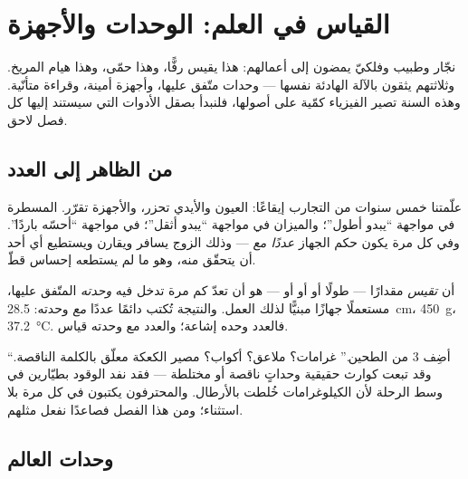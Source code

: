 \chapter{القياس في العلم: الوحدات والأجهزة}\label{ch:g6:measurement-in-science}

نجّار وطبيب وفلكيّ يمضون إلى أعمالهم: هذا يقيس رفًّا، وهذا حمّى،
وهذا هيام المريخ. وثلاثتهم يثقون بالآلة الهادئة نفسها --- وحدات
متّفق عليها، وأجهزة أمينة، وقراءة متأنّية. وهذه السنة تصير
الفيزياء كمّية على أصولها، فلنبدأ بصقل الأدوات التي سيستند إليها
كل فصل لاحق.

\section{من الظاهر إلى العدد}

علّمتنا خمس سنوات من التجارب إيقاعًا: العيون والأيدي تحزر،
والأجهزة تقرّر. المسطرة في مواجهة ``يبدو أطول''؛ والميزان في
مواجهة ``يبدو أثقل''؛  في مواجهة ``أحسّه باردًا''.
وفي كل مرة يكون حكم الجهاز \emph{عددًا مع } --- وذلك الزوج
يسافر ويقارن ويستطيع أي أحد أن يتحقّق منه، وهو ما لم يستطعه
إحساس قطّ.

\begin{definition}\label{def:g6:measurement-in-science:measuring}
أن \emph{تقيس} مقدارًا --- طولًا أو  أو  أو
 --- هو أن تعدّ كم مرة تدخل فيه \emph{وحدته}
المتّفق عليها، مستعملًا جهازًا مبنيًّا لذلك العمل. والنتيجة
تُكتب دائمًا عددًا \emph{مع} وحدته: \qty{28.5}{cm}،
\qty{450}{g}، \qty{37.2}{\celsius}. فالعدد وحده إشاعة؛ والعدد مع
وحدته قياس.
\end{definition}

\begin{example}\label{ex:g6:measurement-in-science:missing}
``أضِف 3 من الطحين.'' غرامات؟ ملاعق؟ أكواب؟ مصير الكعكة معلّق
بالكلمة الناقصة. وقد تبعت كوارث حقيقية وحداتٍ ناقصة أو مختلطة
--- فقد نفد الوقود بطيّارين في وسط الرحلة لأن الكيلوغرامات
خُلطت بالأرطال. والمحترفون يكتبون  في كل مرة بلا استثناء؛
ومن هذا الفصل فصاعدًا نفعل مثلهم.
\end{example}

\section{وحدات العالم}

